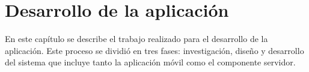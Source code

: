 \chapter{Desarrollo de la aplicación}\label{chapter:Desarrollo de la aplicacion}

En este capítulo se describe el trabajo realizado para el desarrollo de la aplicación. Este proceso se dividió en tres fases: investigación, diseño y desarrollo del sistema que incluye tanto la aplicación móvil como el componente servidor.
